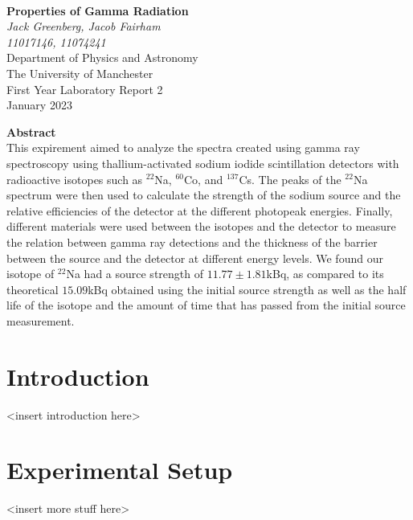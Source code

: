 \documentclass[12pt, a4paper]{article}
\begin{document}
\begin{center}

\noindent \\[10pt]
\color{black}

\thispagestyle{empty} %

\Large{\textbf{Properties of Gamma Radiation}} \\[30pt]
\normalsize \textit{Jack Greenberg, Jacob Fairham}\\[5pt]
\textit{11017146,  11074241}\\[20pt]
Department of Physics and Astronomy \\[5pt]
The University of Manchester \\[20pt]
First Year Laboratory Report 2 \\[20pt]
January 2023 \\[25pt]

\end{center}

\textbf{Abstract}\\[12pt]
This expirement aimed to analyze the spectra created using gamma ray spectroscopy using thallium-activated sodium iodide scintillation detectors with radioactive isotopes such as $^{22}$Na, $^{60}$Co, and $^{137}$Cs. The peaks of the $^{22}$Na spectrum were then used to calculate the strength of the sodium source and the relative efficiencies of the detector at the different photopeak energies. Finally, different materials were used between the isotopes and the detector to measure the relation between gamma ray detections and the thickness of the barrier between the source and the detector at different energy levels. We found our isotope of $^{22}$Na had a source strength of $11.77\pm1.81$kBq, as compared to its theoretical $15.09$kBq obtained using the initial source strength as well as the half life of the isotope and the amount of time that has passed from the initial source measurement.

\noindent 

\pagebreak

\section{Introduction}
	<insert introduction here>

\section{Experimental Setup}
	<insert more stuff here>
\end{document}
